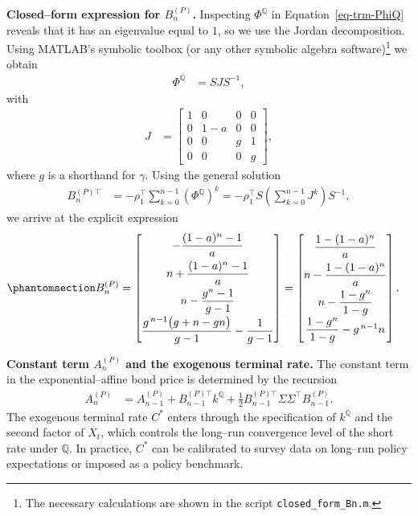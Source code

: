 \documentclass[
  letterpaper,
  DIV=11,
  numbers=noendperiod]{scrreprt}
\begin{document}
\textbf{Closed--form expression for \(B_n^{(P)}\).} Inspecting
\(\Phi^{\mathbb{Q}}\) in Equation~\ref{eq-trm-PhiQ} reveals that it has
an eigenvalue equal to \(1\), so we use the Jordan decomposition. Using
MATLAB's symbolic toolbox (or any other symbolic algebra
software)\footnote{The necessary calculations are shown in the script
  \texttt{closed\_form\_Bn.m}.} we obtain
\begin{align}
\Phi^{\mathbb{Q}} &= S J S^{-1},
\end{align}
with
\begin{align}
J &=
\begin{bmatrix}
1 & 0     & 0 & 0 \\
0 & 1-a   & 0 & 0 \\
0 & 0     & g & 1 \\
0 & 0     & 0 & g
\end{bmatrix},
\end{align}
where \(g\) is a shorthand for \(\gamma\). Using the general solution
\begin{align}
B_n^{(P)\top}
&= -\rho_1^{\top} \sum_{k=0}^{n-1} \left(\Phi^{\mathbb{Q}}\right)^k
 = -\rho_1^{\top} S \left( \sum_{k=0}^{n-1} J^k \right) S^{-1},
\end{align}
we arrive at the explicit expression
\begin{equation}\protect\phantomsection\label{eq-TRM-Bn-closed-form}{
\begin{align}
B_n^{(P)}
&=
\begin{bmatrix}
-\dfrac{(1-a)^n - 1}{a} \\[0.25cm]
 n + \dfrac{(1-a)^n - 1}{a} \\[0.25cm]
 n - \dfrac{g^n - 1}{g - 1} \\[0.25cm]
 \dfrac{g^{\,n-1}\big(g + n - g n\big)}{g - 1} - \dfrac{1}{g - 1}
\end{bmatrix}
=
\begin{bmatrix}
 \dfrac{1-(1-a)^n}{a} \\[0.25cm]
 n - \dfrac{1-(1-a)^n}{a} \\[0.25cm]
 n - \dfrac{1-g^n}{1-g} \\[0.25cm]
 \dfrac{1-g^n}{1-g} - g^{\,n-1} n
\end{bmatrix}.
\end{align}
}\end{equation}

\textbf{Constant term \(A_n^{(P)}\) and the exogenous terminal rate.}
The constant term in the exponential--affine bond price is determined by
the recursion
\begin{align}
A_n^{(P)}
&= A_{n-1}^{(P)} + B_{n-1}^{(P)\top} k^{\mathbb{Q}}
    + \frac{1}{2} B_{n-1}^{(P)\top} \Sigma \Sigma^{\top} B_{n-1}^{(P)}.
\end{align}
The exogenous terminal rate \(C^{*}\) enters through the specification
of \(k^{\mathbb{Q}}\) and the second factor of \(X_t\), which controls
the long--run convergence level of the short rate under \(\mathbb{Q}\).
In practice, \(C^{*}\) can be calibrated to survey data on long--run
policy expectations or imposed as a policy benchmark.
\end{document}
